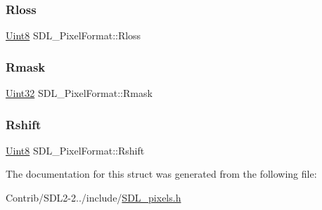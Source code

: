 \subsubsection{\texorpdfstring{Rloss}{Rloss}}
{\footnotesize\ttfamily \mbox{\hyperlink{_s_d_l__stdinc_8h_a2944638813a090aa23e62f4da842c3e2}{Uint8}} S\+D\+L\+\_\+\+Pixel\+Format\+::\+Rloss}

\mbox{\label{struct_s_d_l___pixel_format_a35e5793f6e9c356aec2d130167174946}} 
\subsubsection{\texorpdfstring{Rmask}{Rmask}}
{\footnotesize\ttfamily \mbox{\hyperlink{_s_d_l__stdinc_8h_add440eff171ea5f55cb00c4a9ab8672d}{Uint32}} S\+D\+L\+\_\+\+Pixel\+Format\+::\+Rmask}

\mbox{\label{struct_s_d_l___pixel_format_abfdec7b9ee2ee39db630f4022e4e0daa}} 
\subsubsection{\texorpdfstring{Rshift}{Rshift}}
{\footnotesize\ttfamily \mbox{\hyperlink{_s_d_l__stdinc_8h_a2944638813a090aa23e62f4da842c3e2}{Uint8}} S\+D\+L\+\_\+\+Pixel\+Format\+::\+Rshift}



The documentation for this struct was generated from the following file\+:\begin{DoxyCompactItemize}
\item 
Contrib/\+S\+D\+L2-\/2../include/\mbox{\hyperlink{_s_d_l__pixels_8h}{S\+D\+L\+\_\+pixels.\+h}}\end{DoxyCompactItemize}
